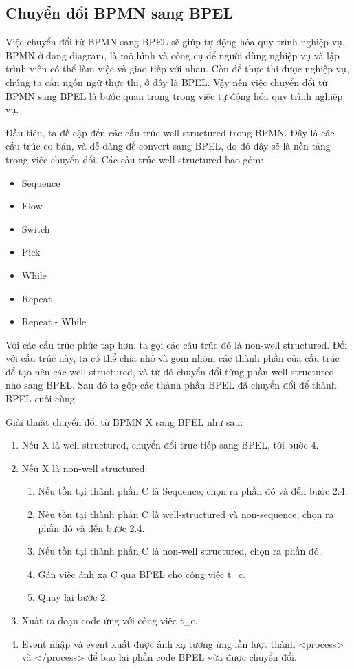 
\subsection{Chuyển đổi BPMN sang BPEL}
\par Việc chuyển đổi từ BPMN sang BPEL sẽ giúp tự động hóa quy trình nghiệp vụ. BPMN ở dạng diagram, là mô hình và công cụ để người dùng nghiệp vụ và lập trình viên có thể làm việc và giao tiếp với nhau. 
Còn để thực thi được nghiệp vụ, chúng ta cần ngôn ngữ thực thi, ở đây là BPEL. Vậy nên việc chuyển đổi từ BPMN sang BPEL là bước quan trọng trong việc tự động hóa quy trình nghiệp vụ.

\par Đầu tiên, ta đề cập đến các cấu trúc well-structured trong BPMN. Đây là các cấu trúc cơ bản, và dễ dàng để convert sang BPEL, do đó đây sẽ là nền tảng trong việc chuyển đổi. Các cấu trúc well-structured bao gồm:
\begin{itemize}
	\item Sequence
	\item Flow
	\item Switch
	\item Pick
	\item While
	\item Repeat
	\item Repeat - While
\end{itemize}

\par Với các cấu trúc phức tạp hơn, ta gọi các cấu trúc đó là non-well structured. Đối với cấu trúc này, ta có thể chia nhỏ và gom nhóm các thành phần của cấu trúc để tạo nên các well-structured, và từ đó chuyển đổi từng phần well-structured nhỏ sang BPEL. 
Sau đó ta gộp các thành phần BPEL đã chuyển đổi để thành BPEL cuối cùng.

\par Giải thuật chuyển đổi từ BPMN X sang BPEL như sau:
\begin{enumerate}
	\item Nếu X là well-structured, chuyển đổi trực tiếp sang BPEL, tới bước 4.
	\item Nếu X là non-well structured:
	\begin{enumerate}
		\item Nếu tồn tại thành phần C là Sequence, chọn ra phần đó và đến bước 2.4.
		\item Nếu tồn tại thành phần C là well-structured và non-sequence, chọn ra phần đó và đến bước 2.4.
		\item Nếu tồn tại thành phần C là non-well structured, chọn ra phần đó.
		\item Gán việc ánh xạ C qua BPEL cho công việc t\_{c}.
		\item Quay lại bước 2.
	\end{enumerate}
	\item Xuất ra đoạn code ứng với công việc t\_{c}.
	\item Event nhập và event xuất được ánh xạ tương ứng lần lượt thành <process> và </process> để bao lại phần code BPEL vừa được chuyển đổi.
\end{enumerate}